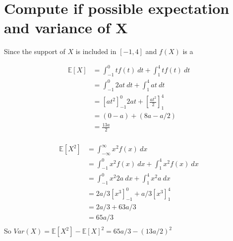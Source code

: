 \documentclass{article}
\newcommand{\E}{\mathbb{E}}
\begin{document}
\section{Compute if possible expectation and variance of X}

Since the support of \(X\) is included in \([-1, 4]\) and \(f(X)\) is a

\begin{align*}
    \E[X]
     & = \int_{- 1}^{0} tf(t) \ dt + \int_{1}^{4} tf(t) \ dt                       \\
     & = \int_{- 1}^{0} 2at \ dt + \int_{1}^{4} at \ dt                            \\
     & = \left[ at^2 \right]_{- 1}^{0} 2at + \left[ \frac{at^2}{2} \right]_{1}^{4} \\
     & = (0 - a) + (8a - a/2)                                                      \\
     & = \frac{13a}{2}                                                             \\
\end{align*}

\begin{align*}
     \E[X^2]
     & = \int_{-\infty}^{\infty} x^2 f(x) \ dx \\
     & = \int_{-1}^{0} x^2 f(x) \ dx + \int_{1}^{4} x^2 f(x) \ dx \\
     & = \int_{-1}^{0} x^2 2a \ dx + \int_{1}^{4} x^2 a \ dx \\
     & = 2a/3 \left[ x^3 \right]_{-1}^{0} + a/3\left[x^3\right]_{1}^{4} \\
     & = 2a/3 + 63a/3 \\
     & = 65a/3 \\
\end{align*}
 So \(Var(X) = \E[X^2] - \E[X]^2 = 65a/3 - \left( 13a/2 \right)^2 \)
\end{document}
